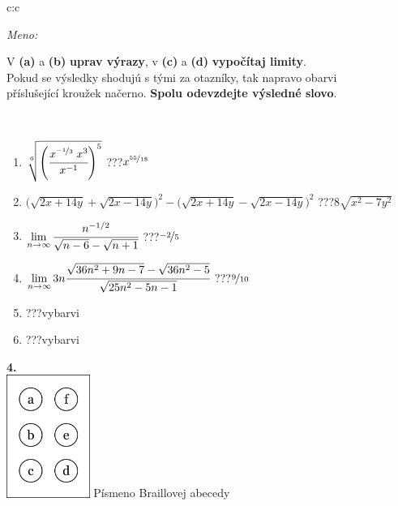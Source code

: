 \documentclass[10pt]{report}
\begin{document}
\begin{tabular}{c:c}
\begin{minipage}[c][104.5mm][t]{0.5\linewidth}
\begin{center}
\textit{Meno:}\phantom{xxxxxxxxxxxxxxxxxxxxxxxxxxxxxxxxxxxxxxxxxxxxxxxxxxxxxxxxxxxxxxxxx}\\[5mm]
\begin{minipage}{0.95\linewidth}
\begin{center}
V \textbf{(a)} a \textbf{(b)} \textbf{uprav výrazy}, v \textbf{(c)} a \textbf{(d)} \textbf{vypočítaj limity}.\\Pokud se výsledky shodujú s tými za otazníky, tak napravo obarvi\\příslušející kroužek načerno. \textbf{Spolu odevzdejte výsledné slovo}.
\end{center}
\end{minipage}
\\[1mm]
\begin{minipage}{0.79\linewidth}
\begin{center}
\begin{varwidth}{\linewidth}
\begin{enumerate}
\small
\item $\sqrt[6]{\left(\cfrac{x^{\nicefrac{-1}{3}}\;x^{3}}{x^{-1}}\right)^{5}}$\quad \dotfill\; ???\;\dotfill \quad $x^{\nicefrac{55}{18}}$
\item {\footnotesize{\scriptsize$\big(\sqrt{2x+14y}+\sqrt{2x-14y}\big)^2-\big(\sqrt{2x+14y}-\sqrt{2x-14y}\big)^2$}\quad \dotfill\; ???\;\dotfill \quad $8\sqrt{x^2-7y^2}$}
\item $\lim\limits_{n\to\infty}\cfrac{n^{-1/2}}{\sqrt{n-6}-\sqrt{n+1}}$\quad \dotfill\; ???\;\dotfill \quad $\nicefrac{-2}{5}$
\item $\lim\limits_{n\to\infty}3n\cfrac{\sqrt{36n^2+9n-7}-\sqrt{36n^2-5}}{\sqrt{25n^2-5n-1}}$\quad \dotfill\; ???\;\dotfill \quad $\nicefrac{9}{10}$
\item \quad \dotfill\; ???\;\dotfill \quad vybarvi
\item \quad \dotfill\; ???\;\dotfill \quad vybarvi
\end{enumerate}
\end{varwidth}
\end{center}
\end{minipage}
\begin{minipage}{0.20\linewidth}
\begin{center}
{\Huge\bfseries 4.} \\[2mm]
\includegraphics[height=40mm]{../images/braille.png}
{\small Písmeno Braillovej abecedy}
\end{center}
\end{minipage}
\end{center}
\end{minipage}
%
\end{tabular}
\end{document}
